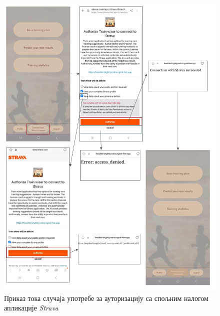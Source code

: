 \documentclass[12pt,oneside]{memoir}
\begin{document}
\begin{figure}[H]
  \centering
  \includegraphics[scale=0.85]{assets/pictures/usecases_flows/strava_auth_flow.png}
    \caption{Приказ тока случаја употребе за ауторизацију са спољним налогом апликације \textit{Strava}}
  \label{pic:strava-auth-flow}
\end{figure}


\newpage
\end{document}
